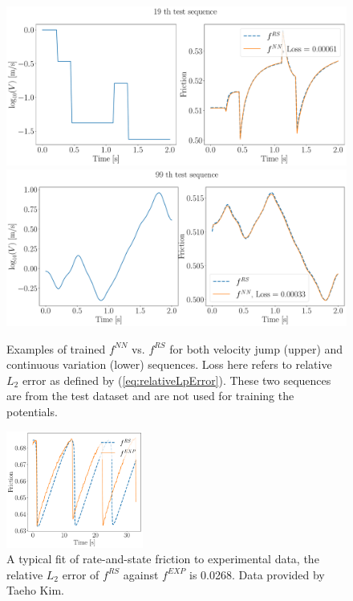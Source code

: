 \begin{figure}[htbp]
    \centering
    \includegraphics[height=0.3\textheight]{figures/19thRSNN.pdf}
    \includegraphics[height=0.3\textheight]{figures/99thRSNN.pdf}
    \caption{Examples of trained $f^{NN}$ vs. $f^{RS}$ for both velocity jump (upper) and continuous variation (lower) sequences. 
    Loss here refers to relative $L_2$ error as defined by (\ref{eq:relativeLpError}). 
    These two sequences are from the test dataset and are not used for training the potentials.}
    \label{fig:19thAnd99thRSNN}
\end{figure}

\begin{figure}[htbp]
    \centering
    \includegraphics[width=0.4\textwidth]{figures/RSVsExp.pdf}
    \caption{A typical fit of rate-and-state friction to experimental data, 
    the relative $L_2$ error of $f^{RS}$ against $f^{EXP}$ is 0.0268. 
    Data provided by Taeho Kim.}
    \label{fig:RSVsExp}
\end{figure}

